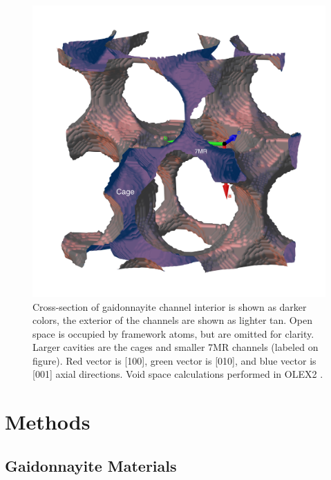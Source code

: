 \documentclass[journal=acsodf,manuscript=article]{achemso}
\begin{document}
\begin{figure}[h!] %
\begin{center}
\includegraphics[width=0.70\columnwidth]{figures/gaidonnayite_CHANNELS_anotated.jpg} 
\caption{{Cross-section of gaidonnayite channel interior is shown as darker
colors, the exterior of the channels are shown as lighter tan. Open
space is occupied by framework atoms, but are omitted for clarity. 
Larger cavities are the cages and smaller 7MR channels (labeled on figure).  Red vector is
{[}100{]}, green vector is {[}010{]}, and blue vector is {[}001{]} axial
directions.  Void space calculations performed in
OLEX2 \cite{Dolomanov_2009}.
{\label{fig_channel_view}}%
}}
\end{center}
\end{figure}

\section{Methods}

{\label{methods_section}}  %

\subsection{Gaidonnayite Materials}

{\label{methods_gaid_materials}}  %
\end{document}
